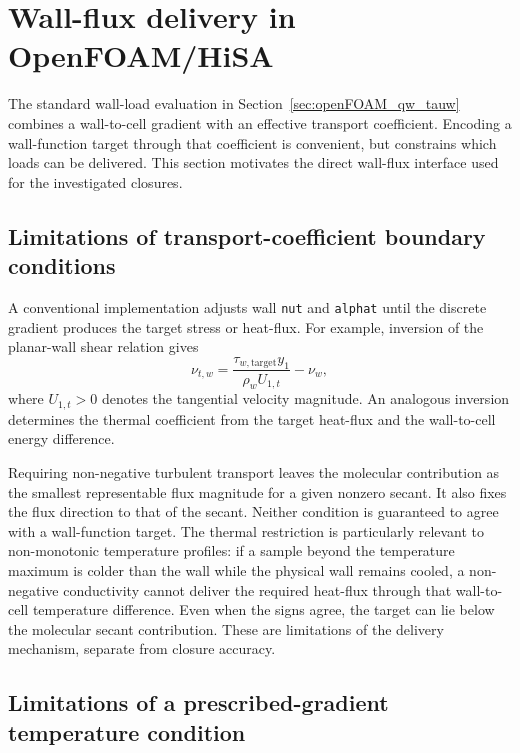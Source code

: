 \section{Wall-flux delivery in OpenFOAM/HiSA}
\label{sec:openFOAM_wall_function_implementation_general}

The standard wall-load evaluation in Section~\ref{sec:openFOAM_qw_tauw} combines a wall-to-cell gradient with an effective transport coefficient. Encoding a wall-function target through that coefficient is convenient, but constrains which loads can be delivered. This section motivates the direct wall-flux interface used for the investigated closures.

\subsection{Limitations of transport-coefficient boundary conditions}

A conventional implementation adjusts wall \texttt{nut} and \texttt{alphat} until the discrete gradient produces the target stress or heat-flux. For example, inversion of the planar-wall shear relation gives
\begin{equation}
    \nu_{t,w}
    =\frac{\tau_{w,\mathrm{target}}y_1}{\rho_w U_{1,t}}-\nu_w,
    \label{eq:nut_BC}
\end{equation}
where \(U_{1,t}>0\) denotes the tangential velocity magnitude. An analogous inversion determines the thermal coefficient from the target heat-flux and the wall-to-cell energy difference.

Requiring non-negative turbulent transport leaves the molecular contribution as the smallest representable flux magnitude for a given nonzero secant. It also fixes the flux direction to that of the secant. Neither condition is guaranteed to agree with a wall-function target. The thermal restriction is particularly relevant to non-monotonic temperature profiles: if a sample beyond the temperature maximum is colder than the wall while the physical wall remains cooled, a non-negative conductivity cannot deliver the required heat-flux through that wall-to-cell temperature difference. Even when the signs agree, the target can lie below the molecular secant contribution. These are limitations of the delivery mechanism, separate from closure accuracy.

\subsection{Limitations of a prescribed-gradient temperature condition}

